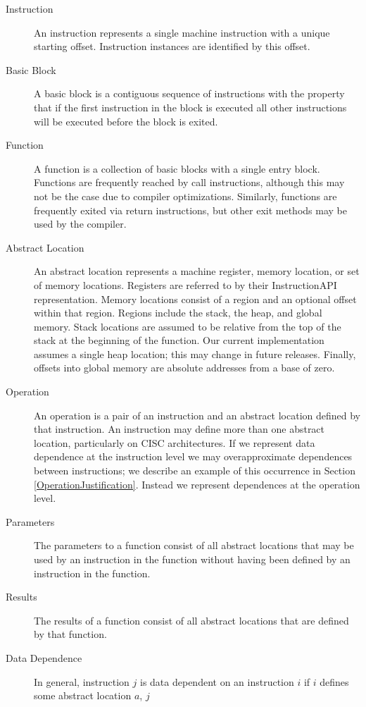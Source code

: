 \documentclass[12pt,titlepage]{article}
\begin{document}
\begin{description}
\item[Instruction] An instruction represents a single machine
instruction with a unique starting offset. Instruction instances are
identified by this offset.
\item[Basic Block] A basic block is a contiguous sequence of
  instructions with the property that if the first instruction in the
  block is executed all other instructions will be executed before the
  block is exited.
\item[Function] A function is a collection of basic blocks with a
  single entry block. Functions are frequently reached by call
  instructions, although this may not be the case due to compiler
  optimizations. Similarly, functions are frequently exited via return
  instructions, but other exit methods may be used by the compiler.
\item[Abstract Location] An abstract location represents a machine
register, memory location, or set of memory locations. Registers are
referred to by their InstructionAPI representation. Memory locations
consist of a region and an optional offset within that region. Regions
include the stack, the heap, and global memory. Stack locations are
assumed to be relative from the top of the stack at the beginning of
the function. Our current implementation assumes a single heap
location; this may change in future releases. Finally, offsets into
global memory are absolute addresses from a base of zero.
\item[Operation] An operation is a pair of an instruction and an
abstract location defined by that instruction. An instruction may
define more than one abstract location, particularly on CISC
architectures. If we represent data dependence at the instruction
level we may overapproximate dependences between instructions; we
describe an example of this occurrence in Section
\ref{OperationJustification}. Instead we represent dependences at the
operation level.
\item[Parameters] The parameters to a function consist of all abstract
  locations that may be used by an instruction in the function without
  having been defined by an instruction in the function.
\item[Results] The results of a function consist of all abstract
  locations that are defined by that function.
\item[Data Dependence] In general, instruction $j$ is data dependent
  on an instruction $i$ if $i$ defines some abstract location $a$, $j$

\end{description}
\end{document}
